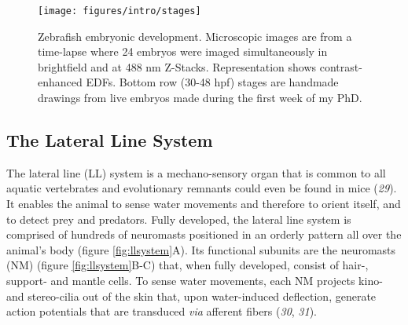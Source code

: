 \documentclass[10pt, b5paper, singlespacinge, twoside]{reedthesis} %
\theoremstyle{definition}
\theoremstyle{definition}
\theoremstyle{definition}
\theoremstyle{remark}
\begin{document}
\begin{figure}

{\centering \texttt{[image: figures/intro/stages]} 

}

\caption[Zebrafish embryonic development]{Zebrafish embryonic development. Microscopic images are from a time-lapse where 24 embryos were imaged simultaneously in brightfield and at 488 nm Z-Stacks. Representation shows contrast-enhanced EDFs. Bottom row (30-48 hpf) stages are handmade drawings from live embryos made during the first week of my PhD.}\label{fig:stages}
\end{figure}
\hypertarget{the-lateral-line-system}{%
\subsection{The Lateral Line System}\label{the-lateral-line-system}}

The lateral line (LL) system is a mechano-sensory organ that is common to all aquatic vertebrates and evolutionary remnants could even be found in mice (\emph{29}). It enables the animal to sense water movements and therefore to orient itself, and to detect prey and predators. Fully developed, the lateral line system is comprised of hundreds of neuromasts positioned in an orderly pattern all over the animal's body (figure \ref{fig:llsystem}A). Its functional subunits are the neuromasts (NM) (figure \ref{fig:llsystem}B-C) that, when fully developed, consist of hair-, support- and mantle cells. To sense water movements, each NM projects kino- and stereo-cilia out of the skin that, upon water-induced deflection, generate action potentials that are transduced \emph{via} afferent fibers (\emph{30}, \emph{31}).
\end{document}
